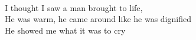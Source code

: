 \\
I thought I saw a man brought to life, \\
He was warm, he came around like he was dignified \\
He showed me what it was to cry \\
